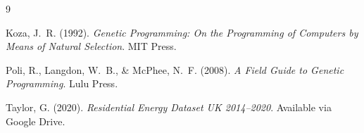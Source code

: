 \documentclass[12pt,a4paper]{article}
\begin{document}
\begin{thebibliography}{9}

Koza, J.~R. (1992).
\textit{Genetic Programming: On the Programming of Computers by Means of Natural Selection}.
MIT Press.

Poli, R., Langdon, W.~B., \& McPhee, N.~F. (2008).
\textit{A Field Guide to Genetic Programming}.
Lulu Press.

Taylor, G. (2020).
\textit{Residential Energy Dataset UK 2014--2020}.
Available via Google Drive.

\end{thebibliography}
\end{document}

